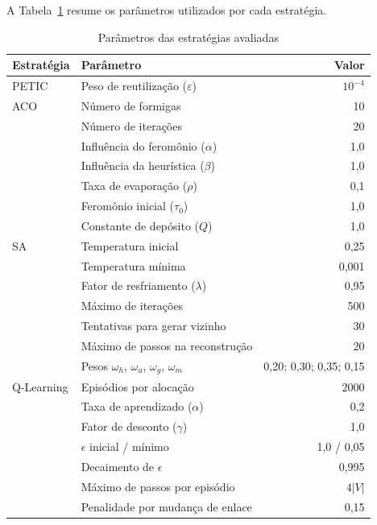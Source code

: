 A Tabela~\ref{tab:parametros} resume os parâmetros utilizados por cada estratégia.

\begin{table}[htb]
    \centering
    \caption{Parâmetros das estratégias avaliadas}
    \label{tab:parametros}
    \begin{tabular}{llr}
        \hline
        \textbf{Estratégia} & \textbf{Parâmetro} & \textbf{Valor} \\
        \hline
        PETIC & Peso de reutilização ($\varepsilon$) & $10^{-4}$ \\
        \hline
        ACO & Número de formigas & 10 \\
            & Número de iterações & 20 \\
            & Influência do feromônio ($\alpha$) & 1,0 \\
            & Influência da heurística ($\beta$) & 1,0 \\
            & Taxa de evaporação ($\rho$) & 0,1 \\
            & Feromônio inicial ($\tau_0$) & 1,0 \\
            & Constante de depósito ($Q$) & 1,0 \\
        \hline
        SA & Temperatura inicial & 0,25 \\
           & Temperatura mínima & 0,001 \\
           & Fator de resfriamento ($\lambda$) & 0,95 \\
           & Máximo de iterações & 500 \\
           & Tentativas para gerar vizinho & 30 \\
           & Máximo de passos na reconstrução & 20 \\
           & Pesos $\omega_h$, $\omega_u$, $\omega_g$, $\omega_m$ & 0,20; 0,30; 0,35; 0,15 \\
        \hline
        Q-Learning & Episódios por alocação & 2000 \\
                   & Taxa de aprendizado ($\alpha$) & 0,2 \\
                   & Fator de desconto ($\gamma$) & 1,0 \\
                   & $\epsilon$ inicial / mínimo & 1,0 / 0,05 \\
                   & Decaimento de $\epsilon$ & 0,995 \\
                   & Máximo de passos por episódio & $4|V|$ \\
                   & Penalidade por mudança de enlace & 0,15 \\
        \hline
    \end{tabular}
\end{table}

